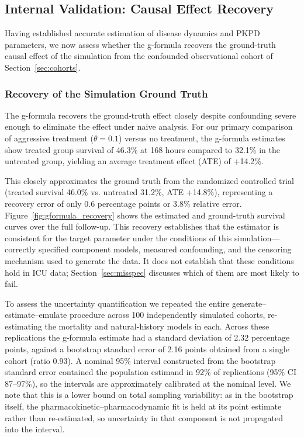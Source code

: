 \subsection{Internal Validation: Causal Effect Recovery}
\label{sec:gformula-results}
Having established accurate estimation of disease dynamics and PKPD parameters, we now assess whether the g-formula recovers the ground-truth causal effect of the simulation from the confounded observational cohort of Section~\ref{sec:cohorts}.

\subsubsection{Recovery of the Simulation Ground Truth}
The g-formula recovers the ground-truth effect closely despite confounding severe enough to eliminate the effect under naive analysis. For our primary comparison of aggressive treatment ($\theta = 0.1$) versus no treatment, the g-formula estimates show treated group survival of 46.3\% at 168 hours compared to 32.1\% in the untreated group, yielding an average treatment effect (ATE) of +14.2\%. 

This closely approximates the ground truth from the randomized controlled trial (treated survival 46.0\% vs. untreated 31.2\%, ATE +14.8\%), representing a recovery error of only 0.6 percentage points or 3.8\% relative error. Figure~\ref{fig:gformula_recovery} shows the estimated and ground-truth survival curves over the full follow-up. This recovery establishes that the estimator is consistent for the target parameter under the conditions of this simulation---correctly specified component models, measured confounding, and the censoring mechanism used to generate the data. It does not establish that these conditions hold in ICU data; Section~\ref{sec:misspec} discusses which of them are most likely to fail.

To assess the uncertainty quantification we repeated the entire generate--estimate--emulate procedure
across 100 independently simulated cohorts, re-estimating the mortality and natural-history models in
each. Across these replications the g-formula estimate had a standard deviation of 2.32 percentage
points, against a bootstrap standard error of 2.16 points obtained from a single cohort (ratio 0.93).
A nominal 95\% interval constructed from the bootstrap standard error contained the population
estimand in 92\% of replications (95\% CI 87--97\%), so the intervals are approximately calibrated at
the nominal level. We note that this is a lower bound on total sampling variability: as in the
bootstrap itself, the pharmacokinetic--pharmacodynamic fit is held at its point estimate rather than
re-estimated, so uncertainty in that component is not propagated into the interval.

